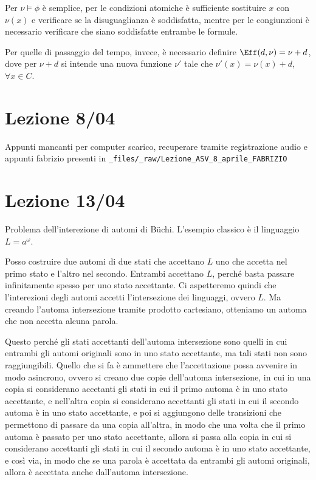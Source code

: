 Per \(\nu\models\phi\) è semplice, per le condizioni atomiche è sufficiente sostituire \(x\) con \(\nu(x)\) e verificare se la disuguaglianza è soddisfatta, mentre per le congiunzioni è necessario verificare che siano soddisfatte entrambe le formule.

Per quelle di passaggio del tempo, invece, è necessario definire \(\Eff(d,\nu) = \nu + d\), dove per \(\nu + d\) si intende una nuova funzione \(\nu'\) tale che \(\nu'(x) = \nu(x)+d\), \(\forall x \in C\).

\chapter{Lezione 8/04}

Appunti mancanti per computer scarico, recuperare tramite registrazione audio e appunti fabrizio presenti in \lstinline{_files/_raw/Lezione_ASV_8_aprile_FABRIZIO}

\chapter{Lezione 13/04}

Problema dell'interezione di automi di Büchi.
L'esempio classico è il linguaggio \(L=a^\omega\).

Posso costruire due automi di due stati che accettano \(L\) uno che accetta nel primo stato e l'altro nel secondo.
Entrambi accettano \(L\), perché basta passare infinitamente spesso per uno stato accettante.
Ci aspetteremo quindi che l'interezioni degli automi accetti l'intersezione dei linguaggi, ovvero \(L\).
Ma creando l'automa intersezione tramite prodotto cartesiano, otteniamo un automa che non accetta alcuna parola.

Questo perché gli stati accettanti dell'automa intersezione sono quelli in cui entrambi gli automi originali sono in uno stato accettante, ma tali stati non sono raggiungibili.
Quello che si fa è ammettere che l'accettazione possa avvenire in modo asincrono, ovvero si creano due copie dell'automa intersezione, in cui in una copia si considerano accetanti gli stati in cui il primo automa è in uno stato accettante, e nell'altra copia si considerano accettanti gli stati in cui il secondo automa è in uno stato accettante, e poi si aggiungono delle transizioni che permettono di passare da una copia all'altra, in modo che una volta che il primo automa è passato per uno stato accettante, allora si passa alla copia in cui si considerano accettanti gli stati in cui il secondo automa è in uno stato accettante, e così via, in modo che se una parola è accettata da entrambi gli automi originali, allora è accettata anche dall'automa intersezione.

